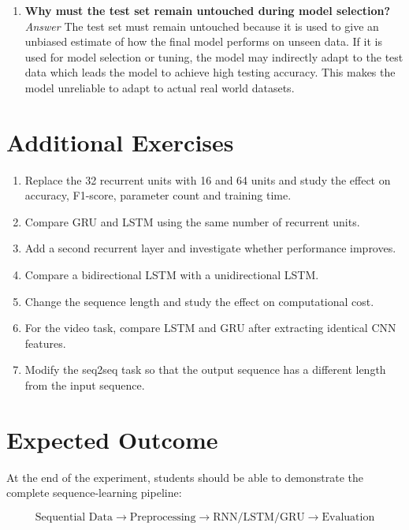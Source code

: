 \documentclass[10pt]{article}
\begin{document}
\begin{enumerate}
\item \textbf{Why must the test set remain untouched during model selection?}\\
\textit{Answer} The test set must remain untouched because it is used to give an unbiased estimate of how the final model performs on unseen data. If it is used for model selection or tuning, the model may indirectly adapt to the test data which leads the model to achieve high testing accuracy. This makes the model unreliable to adapt to actual real world datasets.\\
\vspace{8mm}

\end{enumerate}

\section{Additional Exercises}

\begin{enumerate}
\item Replace the 32 recurrent units with 16 and 64 units and study the effect
on accuracy, F1-score, parameter count and training time.
\item Compare GRU and LSTM using the same number of recurrent units.
\item Add a second recurrent layer and investigate whether performance improves.
\item Compare a bidirectional LSTM with a unidirectional LSTM.
\item Change the sequence length and study the effect on computational cost.
\item For the video task, compare LSTM and GRU after extracting identical CNN
features.
\item Modify the seq2seq task so that the output sequence has a different
length from the input sequence.
\end{enumerate}

\section{Expected Outcome}

At the end of the experiment, students should be able to demonstrate the
complete sequence-learning pipeline:

\[
\boxed{
\text{Sequential Data}
\rightarrow
\text{Preprocessing}
\rightarrow
\text{RNN/LSTM/GRU}
\rightarrow
\text{Evaluation}
}
\]
\end{document}
